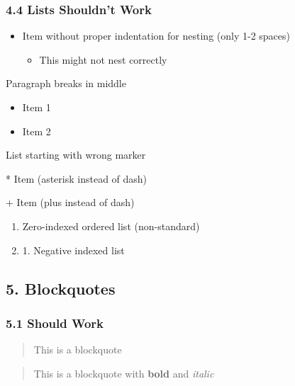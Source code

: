 \documentclass{article}
\begin{document}
\subsubsection{ 4.4 Lists Shouldn't Work}

\begin{itemize}
\item  Item without proper indentation for nesting (only 1-2 spaces)
\begin{itemize}
\item  This might not nest correctly
\end{itemize}


\end{itemize}

Paragraph breaks in middle

\begin{itemize}
\item  Item 1
\end{itemize}

\begin{itemize}
\item  Item 2
\end{itemize}

List starting with wrong marker

* Item (asterisk instead of dash)

+ Item (plus instead of dash)

\begin{enumerate}
\item  Zero-indexed ordered list (non-standard)
\item 1. Negative indexed list
\end{enumerate}

\noindent\hrulefill

\subsection{ 5. Blockquotes}

\subsubsection{ 5.1 Should Work}

\begin{quote}
 This is a blockquote

\end{quote}

\begin{quote}
 This is a blockquote with \textbf{bold} and \emph{italic}

\end{quote}
\end{document}
